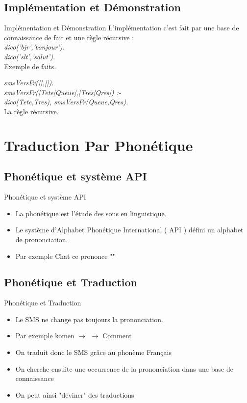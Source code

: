 \documentclass{beamer}
\begin{document}
\subsection{Implémentation et Démonstration}
\begin{frame}{Implémentation et Démonstration}
	L'implémentation c'est fait par une base de connaissance de fait et une règle récursive :\\
	\medskip
	\emph{dico('bjr','bonjour').\\
	dico('slt','salut').\\}
	\smallskip
	\small{Exemple de faits.\\}
	
	\bigskip
	
	\emph{smsVersFr([],[]).\\
	smsVersFr([Tete|Queue],[Tres|Qres]) :-\\
        dico(Tete,Tres), smsVersFr(Queue,Qres).\\}
    \smallskip
    \small{La règle récursive.}
	
	
\end{frame}


\section{Traduction Par Phonétique}

\subsection{Phonétique et système API}
\begin{frame}{Phonétique et système API}
	\begin{itemize}
		\item La phonétique est l'étude des sons en linguistique.
		\item Le système d'Alphabet Phonétique International ( API ) défini un alphabet de prononciation.
		\item Par exemple Chat ce prononce ""
	\end{itemize}
\end{frame}

\subsection{Phonétique et Traduction}
\begin{frame}{Phonétique et Traduction}
	\begin{itemize}
		\item Le SMS ne change pas toujours la prononciation.
		\item Par exemple komen $\rightarrow$  $\rightarrow$ Comment
		\item On traduit donc le SMS grâce au phonème Français
		\item On cherche ensuite une occurrence de la prononciation dans une base de connaissance
		\item On peut ainsi "deviner" des traductions
	\end{itemize}
\end{frame}
\end{document}
